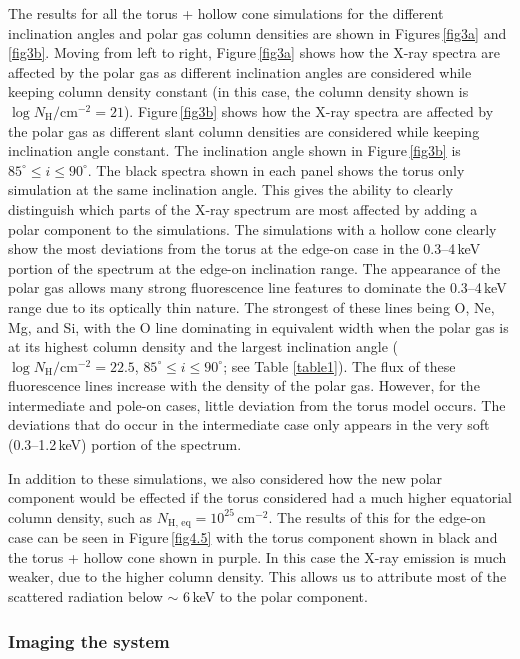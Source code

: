 \documentclass[fleqn,usenatbib]{mnras}
\begin{document}
        The results for all the torus + hollow cone simulations for the different inclination angles and polar gas column densities are shown in Figures\,\ref{fig3a} and \ref{fig3b}. Moving from left to right, Figure\,\ref{fig3a} shows how the X-ray spectra are affected by the polar gas as different inclination angles are considered while keeping column density constant (in this case, the column density shown is $\log{N_{\mathrm{H}}}\big/\text{cm}^{-2} = 21$). Figure\,\ref{fig3b} shows how the X-ray spectra are affected by the polar gas as different slant column densities are considered while keeping inclination angle constant. The inclination angle shown in Figure\,\ref{fig3b} is $85^{\circ} \leq i \leq 90^{\circ}$. The black spectra shown in each panel shows the torus only simulation at the same inclination angle. This gives the ability to clearly distinguish which parts of the X-ray spectrum are most affected by adding a polar component to the simulations. The simulations with a hollow cone clearly show the most deviations from the torus at the edge-on case in the 0.3--4\,keV portion of the spectrum at the edge-on inclination range. The appearance of the polar gas allows many strong fluorescence line features to dominate the 0.3--4\,keV range due to its optically thin nature. The strongest of these lines being O, Ne, Mg, and Si, with the O line dominating in equivalent width when the polar gas is at its highest column density and the largest inclination angle ($\log{N_{\mathrm{H}}}\big/\text{cm}^{-2} = 22.5$, $85^{\circ} \leq i \leq 90^{\circ}$; see Table \ref{table1}). The flux of these fluorescence lines increase with the density of the polar gas. However, for the intermediate and pole-on cases, little deviation from the torus model occurs. The deviations that do occur in the intermediate case only appears in the very soft (0.3--1.2\,keV) portion of the spectrum.
        
        In addition to these simulations, we also considered how the new polar component would be effected if the torus considered had a much higher equatorial column density, such as $N_{\text{H, eq}} = 10^{25}$\,cm$^{-2}$. The results of this for the edge-on case can be seen in Figure\,\ref{fig4.5} with the torus component shown in black and the torus + hollow cone shown in purple. In this case the X-ray emission is much weaker, due to the higher column density. This allows us to attribute most of the scattered radiation below $\sim$ 6\,keV to the polar component.

        \subsubsection{Imaging the system}
        
\end{document}
